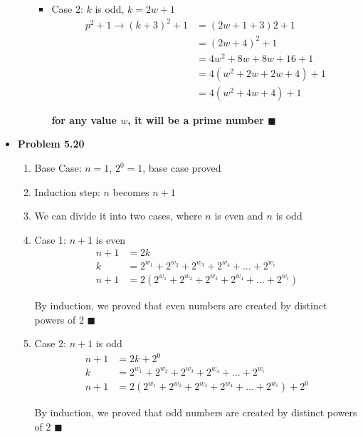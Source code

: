 \documentclass{article}
\begin{document}
\begin{itemize}
\begin{enumerate}[(l)]
\begin{itemize}
\begin{center}
                \end{center}
                \item Case 2: $k$ is odd, $k = 2w + 1$
                \begin{align*}
                    p^2 + 1 \rightarrow (k+3)^2 + 1 &= (2w+1+3)2 + 1\\
                    &=(2w+4)^2 + 1\\
                    &=4w^2 + 8w + 8w + 16 + 1\\
                    &=4(w^2 + 2w + 2w + 4) + 1\\
                    &=4(w^2 + 4w + 4) + 1
                \end{align*}
                \begin{center}
                    \textbf{for any value $w$, it will be a prime number $\blacksquare$}
                \end{center}
            \end{itemize}
        \end{enumerate}
        
        \item \textbf{Problem 5.20}
        \begin{enumerate}
            \item Base Case: $n = 1$, $2^0 = 1$, base case proved 
            \item Induction step: $n$ becomes $n+1$
            \item We can divide it into two cases, where $n$ is even and $n$ is odd
            \item Case 1: $n + 1$ is even
            \begin{align*}
                n + 1&= 2k\\
                k &= 2^{w_1} + 2^{w_2} + 2^{w_3} + 2^{w_4} + ... + 2^{w_i}\\
                n + 1&= 2(2^{w_1} + 2^{w_2} + 2^{w_3} + 2^{w_4} + ... + 2^{w_i})
            \end{align*}
            \begin{center}
                By induction, we proved that even numbers are created by distinct powers of 2 $\blacksquare$
            \end{center}

            \item Case 2: $n + 1$ is odd
            \begin{align*}
                n + 1&=2k + 2^0\\
                k &= 2^{w_1} + 2^{w_2} + 2^{w_3} + 2^{w_4} + ... + 2^{w_i}\\
                n + 1 &= 2(2^{w_1} + 2^{w_2} + 2^{w_3} + 2^{w_4} + ... + 2^{w_i}) + 2^0
            \end{align*}
            \begin{center}
                By induction, we proved that odd numbers are created by distinct powers of 2 $\blacksquare$
            \end{center}
        \end{enumerate}
        

\end{itemize}
\end{document}
